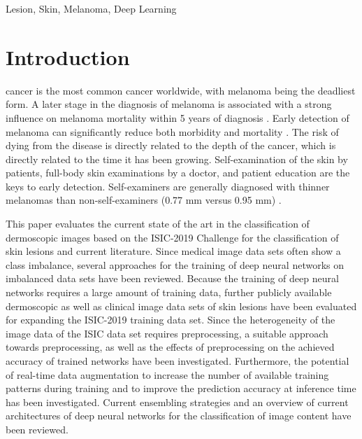 \documentclass[journal]{IEEEtran}
\begin{document}
\begin{IEEEkeywords}
Lesion, Skin, Melanoma, Deep Learning
\end{IEEEkeywords}






\IEEEpeerreviewmaketitle



\section{Introduction}
 cancer is the most common cancer worldwide, with melanoma being the deadliest form.
A later stage in the diagnosis of melanoma is associated with a strong influence on melanoma mortality within 5 years of diagnosis \cite{wernli2016screening}. Early detection of melanoma can significantly reduce both morbidity and mortality \cite{di2018computer}. The risk of dying from the disease is directly related to the depth of the cancer, which is directly related to the time it has been growing. Self-examination of the skin by patients, full-body skin examinations by a doctor, and patient education are the keys to early detection. Self-examiners are generally diagnosed with thinner melanomas than non-self-examiners (0.77 mm versus 0.95 mm) \cite{carli2003dermatologist}.



This paper evaluates the current state of the art in the classification of dermoscopic images based on the ISIC-2019 Challenge for the classification of skin lesions and current literature. Since medical image data sets often show a class imbalance, several approaches for the training of deep neural networks on imbalanced data sets have been reviewed. Because the training of deep neural networks requires a large amount of training data, further publicly available dermoscopic as well as clinical image data sets of skin lesions have been evaluated for expanding the ISIC-2019 training data set. Since the heterogeneity of the image data of the ISIC data set requires preprocessing, a suitable approach towards preprocessing, as well as the effects of preprocessing on the achieved accuracy of trained networks have been investigated. Furthermore, the potential of real-time data augmentation to increase the number of available training patterns during training and to improve the prediction accuracy at inference time has been investigated. Current ensembling strategies and an overview of current architectures of deep neural networks for the classification of image content have been reviewed.
\end{document}
